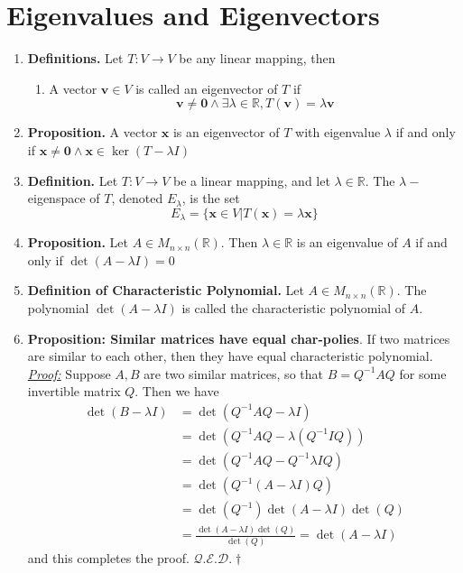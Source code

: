 \documentclass[oneside, 12pt]{book}
\newcommand{\settag}[1]{\renewcommand{\theenumi}{#1}}
\newcommand{\R}{\mathbb{R}}
\newcommand{\qed}{\hfill $\mathcal{Q}.\mathcal{E}.\mathcal{D}.\dagger$}
\newcommand{\tbf}[1]{\textbf{#1}}
\newcommand{\tit}[1]{\textit{#1}}
\newcommand{\proof}{\tit{\underline{Proof:}}} %
\newcommand{\trans}[3]{$#1:#2\rightarrow{}#3$}
\newcommand{\mat}[2]{M_{#1 \times #2}(\R)}
\newcommand{\para}[1]{\item \tbf{#1}}
\newcommand{\vv}{\mathbf{v}}
\newcommand{\vx}{\mathbf{x}}
\newcommand{\vzero}{\mathbf{0}}
\begin{document}
\section{Eigenvalues and Eigenvectors}
\begin{enumerate}
    \settag{4.1.2}
    \para{Definitions.} Let \trans{T}{V}{V} be any linear mapping, then
    \begin{enumerate}
        \item A vector $\vv \in V$ is called an eigenvector of $T$ if
        \begin{equation*}
            \vv \neq \vzero \land \exists \lambda \in \R, T(\vv) = \lambda \vv
        \end{equation*} 
    \end{enumerate}
    
    \settag{4.1.5}
    \para{Proposition.} A vector $\vx$ is an eigenvector of $T$ with eigenvalue $\lambda$ if and only if $\vx \neq \vzero \land \vx \in \ker(T-\lambda I)$
    
    \settag{4.1.6}
    \para{Definition.} Let \trans{T}{V}{V} be a linear mapping, and let $\lambda \in \R$. The $\lambda-$eigenspace of $T$, denoted $E_\lambda$, is the set
    \begin{equation*}
        E_\lambda = \{\vx\in V|T(\vx) = \lambda \vx\}
    \end{equation*}
    
    \settag{4.1.9}
    \para{Proposition.} Let $A\in \mat{n}{n}$. Then $\lambda \in \R$ is an eigenvalue of $A$ if and only if $\det(A-\lambda I) = 0$
    
    \settag{4.1.11}
    \para{Definition of Characteristic Polynomial.} Let $A\in \mat{n}{n}$. The polynomial $\det(A-\lambda I)$ is called the characteristic polynomial of $A$.
    
    \settag{4.1.12}
    \para{Proposition: Similar matrices have equal char-polies}. If two matrices are similar to each other, then they have equal characteristic polynomial. \newline
    \proof \newline
    Suppose $A, B$ are two similar matrices, so that $B = Q^{-1}AQ$ for some invertible matrix $Q$. Then we have
    \begin{align*}
        \det(B-\lambda I) 
        &= \det(Q^{-1}AQ - \lambda I) \\
        &= \det(Q^{-1}AQ - \lambda(Q^{-1} IQ)) \\
        &= \det(Q^{-1}AQ - Q^{-1}\lambda IQ) \\
        &= \det(Q^{-1}(A-\lambda I)Q) \\
        &= \det(Q^{-1})\det(A-\lambda I)\det(Q) \\
        &= \frac{\det(A-\lambda I)\det(Q)}{\det(Q)} = \det(A-\lambda I)
    \end{align*}
    and this completes the proof. \qed \newline
    

\end{enumerate}
\end{document}
